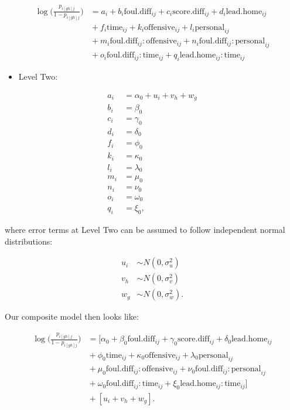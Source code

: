 \documentclass[
]{krantz}
\providecommand{\tightlist}{%
  \setlength{\itemsep}{0pt}\setlength{\parskip}{0pt}}
\begin{document}
\begin{align*}
\log\bigg(\frac{p_{i[gh]j}}{1-p_{i[gh]j}}\bigg) & = a_{i} + b_{i}\mathrm{foul.diff}_{ij} + c_{i}\mathrm{score.diff}_{ij} + d_{i}\mathrm{lead.home}_{ij} \\ 
 &{} + f_{i}\mathrm{time}_{ij} + k_{i}\mathrm{offensive}_{ij} + l_{i}\mathrm{personal}_{ij} \\ 
 &{} + m_{i}\mathrm{foul.diff}_{ij}:\mathrm{offensive}_{ij} + n_{i}\mathrm{foul.diff}_{ij}:\mathrm{personal}_{ij} \\ 
 &{} + o_{i}\mathrm{foul.diff}_{ij}:\mathrm{time}_{ij} + q_{i}\mathrm{lead.home}_{ij}:\mathrm{time}_{ij}
\end{align*}

\begin{itemize}
\tightlist
\item
  Level Two:
\end{itemize}

\begin{align*}
a_{i} & = \alpha_{0}+u_{i}+v_{h}+w_{g} \\
b_{i} & = \beta_{0} \\
c_{i} & = \gamma_{0} \\
d_{i} & = \delta_{0} \\
f_{i} & = \phi_{0} \\
k_{i} & = \kappa_{0} \\
l_{i} & = \lambda_{0} \\
m_{i} & = \mu_{0} \\
n_{i} & = \nu_{0} \\
o_{i} & = \omega_{0} \\
q_{i} & = \xi_{0},
\end{align*}

where error terms at Level Two can be assumed to follow independent normal distributions:

\begin{align*}
u_{i} & \sim N \left( 0 , \sigma_{u}^{2} \right) \\
v_{h} & \sim N \left( 0 , \sigma_{v}^{2} \right) \\
w_{g} & \sim N \left( 0 , \sigma_{w}^{2} \right).
\end{align*}

Our composite model then looks like:

\begin{align*}
\log\bigg(\frac{p_{i[gh]j}}{1-p_{i[gh]j}}\bigg) & = [\alpha_{0} + \beta_{0}\mathrm{foul.diff}_{ij} + \gamma_{0}\mathrm{score.diff}_{ij} + \delta_{0}\mathrm{lead.home}_{ij} \\ 
 &{} + \phi_{0}\mathrm{time}_{ij} + \kappa_{0}\mathrm{offensive}_{ij} + \lambda_{0}\mathrm{personal}_{ij} \\ 
 &{} + \mu_{0}\mathrm{foul.diff}_{ij}:\mathrm{offensive}_{ij} + \nu_{0}\mathrm{foul.diff}_{ij}:\mathrm{personal}_{ij} \\ 
 &{} + \omega_{0}\mathrm{foul.diff}_{ij}:\mathrm{time}_{ij} + \xi_{0}\mathrm{lead.home}_{ij}:\mathrm{time}_{ij}] \\ 
 &{} + [u_{i}+v_{h}+w_{g}].
\end{align*}
\end{document}
